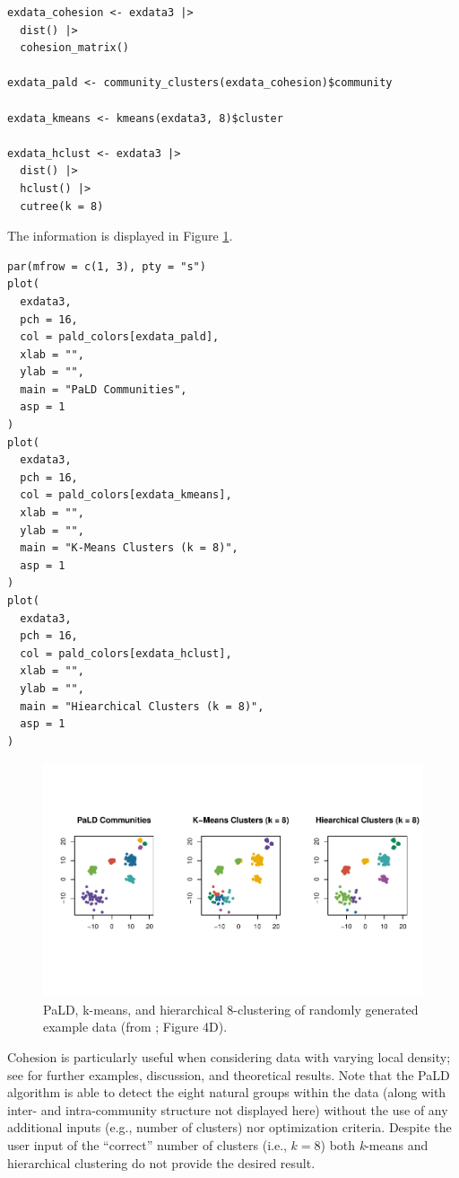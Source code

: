 \begin{verbatim}
exdata_cohesion <- exdata3 |>
  dist() |>
  cohesion_matrix()

exdata_pald <- community_clusters(exdata_cohesion)$community

exdata_kmeans <- kmeans(exdata3, 8)$cluster

exdata_hclust <- exdata3 |>
  dist() |>
  hclust() |>
  cutree(k = 8)
\end{verbatim}

The information is displayed in Figure \ref{fig:fig5}.

\begin{verbatim}
par(mfrow = c(1, 3), pty = "s")
plot(
  exdata3,
  pch = 16,
  col = pald_colors[exdata_pald],
  xlab = "",
  ylab = "",
  main = "PaLD Communities",
  asp = 1
)
plot(
  exdata3,
  pch = 16,
  col = pald_colors[exdata_kmeans],
  xlab = "",
  ylab = "",
  main = "K-Means Clusters (k = 8)",
  asp = 1
)
plot(
  exdata3,
  pch = 16,
  col = pald_colors[exdata_hclust],
  xlab = "",
  ylab = "",
  main = "Hiearchical Clusters (k = 8)",
  asp = 1
)
\end{verbatim}

\begin{figure}[H]
\centering
\includegraphics[width=5in,trim=0in 1in 0in .4in,clip]{dagostino-mcgowan_files/figure-latex/fig5-1.pdf}
\caption{\label{fig:fig5}PaLD, k-means, and hierarchical 8-clustering of randomly generated example data (from \citet{berenhaut2022social}; Figure 4D).}
\end{figure}

Cohesion is particularly useful when considering data with varying local density; see \citet{berenhaut2022social} for further examples, discussion, and theoretical results. Note that the PaLD algorithm is able to detect the eight natural groups within the data (along with inter- and intra-community structure not displayed here) without the use of any additional inputs (e.g., number of clusters) nor optimization criteria. Despite the user input of the ``correct'' number of clusters (i.e., \(k = 8\)) both \emph{k}-means and hierarchical clustering do not provide the desired result.

